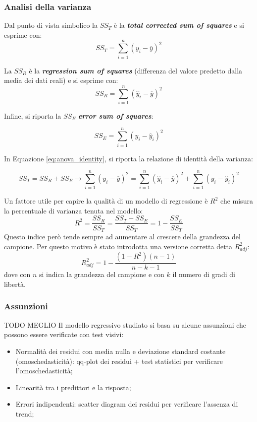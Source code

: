 \documentclass{article}
\begin{document}
\subsubsection{Analisi della varianza}
Dal punto di vista simbolico la $SS_T$ è la \textbf{\textit{total corrected sum of squares}}
e si esprime con:
\[
  SS_T = \displaystyle\sum_{i=1}^{n} (y_i - \overline{y})^2
\]

La $SS_R$ è la \textbf{\textit{regression sum of squares}} (differenza del valore predetto 
dalla media dei dati reali) e si esprime con:
\[
  SS_R = \displaystyle\sum_{i=1}^{n}(\hat{y}_i - \overline{y})^2
\]

Infine, si riporta la $SS_E$ \textbf{\textit{error sum of squares}}:

\[
  SS_E = \displaystyle\sum_{i=1}^{n} (y_i - \hat{y}_i)^2
\]

In Equazione \ref{eq:anova_identity}, si riporta la relazione di identità della varianza:

\begin{equation}
  SS_T = SS_R + SS_E \rightarrow \displaystyle\sum_{i=1}^{n}(y_i - \overline{y})^2 = 
  \displaystyle\sum_{i=1}^{n}(\hat{y}_i - \overline{y})^2 + 
  \displaystyle\sum_{i=1}^{n}(y_i - \hat{y}_i)^2
  \label{eq:anova_identity}
\end{equation}

Un fattore utile per capire la qualità di un modello di regressione è $R^2$ che misura 
la percentuale di varianza tenuta nel modello:
\[
  R^2 = \frac{SS_R}{SS_T} = \frac{SS_T - SS_E}{SS_T} = 1 - \frac{SS_E}{SS_T} 
\]
Questo indice però tende sempre ad aumentare al crescere della grandezza del campione. Per 
questo motivo è stato introdotta una versione corretta detta $R_{adj}^2$:
\[
  R_{adj}^2 = 1 - \frac{(1-R^2)(n-1)}{n-k-1}
\]
dove con $n$ si indica la grandezza del campione e con $k$ il numero di gradi di libertà.

\subsubsection{Assunzioni}
TODO MEGLIO
Il modello regressivo studiato si basa su alcune assunzioni che possono essere verificate con
test visivi:
\begin{itemize}
  \item Normalità dei residui con media nulla e deviazione standard costante
    (omoschedasticità): qq-plot dei residui + test statistici per verificare
    l'omoschedasticità;
  \item Linearità tra i predittori e la risposta;
  \item Errori indipendenti: scatter diagram dei residui per verificare l'assenza di trend;
\end{itemize}
\end{document}
